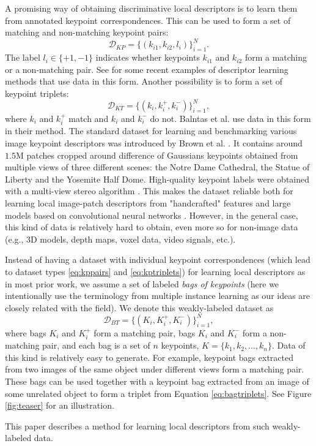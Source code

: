 \documentclass[10pt,conference,a4paper]{IEEEtran}
\begin{document}
		A promising way of obtaining discriminative local descriptors is to learn them from annotated keypoint correspondences.
		This can be used to form a set of matching and non-matching keypoint pairs:
		\begin{equation}\label{eq:kppairs}
			\mathcal{D}_{KP}=
			\{(k_{i1}, k_{i2}, l_i)\}_{i=1}^N
			.
		\end{equation}
		The label $l_i\in\{+1, -1\}$ indicates whether keypoints $k_{i1}$ and $k_{i2}$ form a matching or a non-matching pair.
		See \cite{brown,binboost,rfd,zagoruyko,matchnet,convdesc} for some recent examples of descriptor learning methods that use data in this form.
		Another possibility is to form a set of keypoint triplets:
		\begin{equation}\label{eq:kptriplets}
			\mathcal{D}_{KT}=
			\{(k_i, k_i^+, k_i^-)\}_{i=1}^N
			,
		\end{equation}
		where $k_i$ and $k_i^+$ match and $k_i$ and $k_i^-$ do not.
		Balntas et al. \cite{pnnet} use data in this form in their method.
		The standard dataset for learning and benchmarking various image keypoint descriptors was introduced by Brown et al. \cite{brown}. %
		It contains around $1.5$M patches cropped around difference of Gaussians keypoints \cite{sift} obtained from multiple views of three different scenes: the Notre Dame Cathedral, the Statue of Liberty and the Yosemite Half Dome.
		High-quality keypoint labels were obtained with a multi-view stereo algorithm \cite{multiviewstereo}.
		This makes the dataset reliable both for learning local image-patch descriptors from "handcrafted" features \cite{cvx,binboost,rfd} and large models based on convolutional neural networks \cite{osendorfer,zagoruyko,matchnet,fracking,convdesc,pnnet}.
		However, in the general case, this kind of data is relatively hard to obtain, even more so for non-image data (e.g., 3D models, depth maps, voxel data, video signals, etc.).

		Instead of having a dataset with individual keypoint correspondences (which lead to dataset types \eqref{eq:kppairs} and \eqref{eq:kptriplets}) for learning local descriptors as in most prior work, we assume a set of labeled \emph{bags of keypoints}
		(here we intentionally use the terminology from multiple instance learning \cite{MIL} as our ideas are closely related with the field).
		We denote this weakly-labeled dataset as
		\begin{equation}\label{eq:bagtriplets}
			\mathcal{D}_{BT}=
			\{(K_{i}, K_i^+, K_i^-)\}_{i=1}^N
			,
		\end{equation}
		where bags $K_i$ and $K_i^+$ form a matching pair, bags $K_i$ and $K_i^-$ form a non-matching pair, and each bag is a set of $n$ keypoints, $K=\{k_1, k_2, \ldots, k_n\}$.
		Data of this kind is relatively easy to generate.
		For example, keypoint bags extracted from two images of the same object under different views form a matching pair.
		These bags can be used together with a keypoint bag extracted from an image of some unrelated object to form a triplet from Equation \eqref{eq:bagtriplets}.
		See Figure \ref{fig:teaser} for an illustration.
		
		This paper describes a method for learning local descriptors from such weakly-labeled data.
\end{document}
